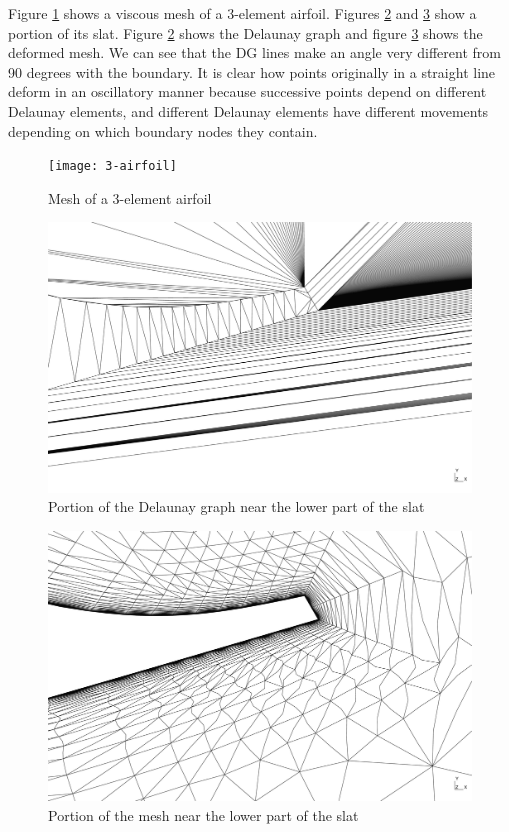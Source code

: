 \documentclass{article}
\begin{document}
Figure \ref{wmesh} shows a viscous mesh of a 3-element airfoil. Figures \ref{dg} and \ref{mesh} show a portion of its slat. Figure \ref{dg} shows the Delaunay graph and figure \ref{mesh} shows the deformed mesh. We can see that the DG lines make an angle very different from 90 degrees with the boundary. It is clear how points originally in a straight line deform in an oscillatory manner because successive points depend on different Delaunay elements, and different Delaunay elements have different movements depending on which boundary nodes they contain.
\FloatBarrier
\begin{figure}[!h]
	\centering
	\texttt{[image: 3-airfoil]}
	\caption{Mesh of a 3-element airfoil}
	\label{wmesh}
\end{figure}
\clearpage
\begin{figure}[p!]
	\centering
	\includegraphics[scale=0.25]{dg-3airfoil-zoomed}
	\caption{Portion of the Delaunay graph near the lower part of the slat}
	\label{dg}
\end{figure}
\begin{figure}[p!]
	\centering
	\includegraphics[scale=0.25]{mesh-3airfoil-zoomed}
	\caption{Portion of the mesh near the lower part of the slat}
	\label{mesh}
\end{figure}
\end{document}
